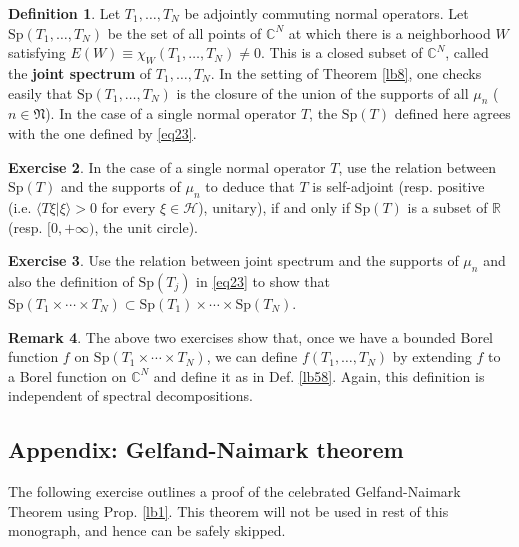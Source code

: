 \documentclass[12pt,b5paper,notitlepage]{article}
\theoremstyle{definition}
\newtheorem{df}{Definition}[section]
\newtheorem{exe}[df]{Exercise}
\newtheorem{rem}[df]{Remark}
\theoremstyle{plain}
\newcommand{\fk}{\mathfrak}
\newcommand{\mc}{\mathcal}
\newcommand{\bk}[1]{\langle {#1}\rangle}
\newcommand{\Cbb}{\mathbb C}
\newcommand{\Rbb}{\mathbb R}
\newcommand{\Sp}{\mathrm{Sp}}
\numberwithin{equation}{section}
\begin{document}
\begin{df}
Let $T_1,\dots,T_N$ be adjointly commuting normal operators. Let $\Sp(T_1,\dots,T_N)$ be the set of all points of $\Cbb^N$ at which there is a neighborhood $W$ satisfying $E(W)\equiv \chi_W(T_1,\dots,T_N)\neq0$. \index{Sp@$\Sp(T_1,\dots,T_N)$} This is a closed subset of $\Cbb^N$, called the \textbf{joint spectrum} of $T_1,\dots,T_N$. In the setting of Theorem \ref{lb8}, one checks easily that $\Sp(T_1,\dots,T_N)$ is the closure of the union of the supports of all $\mu_n$ ($n\in\fk N$). In the case of a single normal operator $T$, the $\Sp(T)$ defined here agrees with the one defined by \eqref{eq23}.
\end{df}



\begin{exe}
In the case of a single normal operator $T$, use the relation between $\Sp(T)$ and the supports of $\mu_n$ to deduce  that  $T$ is self-adjoint (resp. positive (i.e. $\bk{T\xi|\xi}>0$ for every $\xi\in\mc H$), unitary), if and only if $\Sp(T)$ is a subset of $\Rbb$ (resp. $[0,+\infty)$, the unit circle).
\end{exe}

\begin{exe}
Use the relation between joint spectrum and the supports of $\mu_n$ and also the definition of $\Sp(T_j)$ in \eqref{eq23} to show that  $\Sp(T_1\times\cdots\times T_N)\subset\Sp(T_1)\times\cdots\times\Sp(T_N)$.
\end{exe}

\begin{rem}\label{lb12}
The above two exercises show that, once we have a bounded Borel function $f$ on $\Sp(T_1\times\cdots\times T_N)$, we can define $f(T_1,\dots,T_N)$ by extending $f$ to a Borel function on $\Cbb^N$ and define it as in Def. \ref{lb58}. Again, this definition is independent of spectral decompositions.
\end{rem}




\subsection*{Appendix: Gelfand-Naimark theorem}

The following exercise outlines a proof of the celebrated Gelfand-Naimark Theorem using Prop. \ref{lb1}. This theorem will not be used in rest of this monograph, and hence can be safely skipped. 
\end{document}
